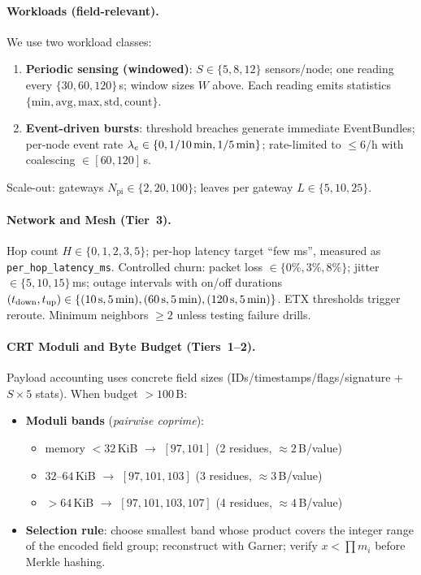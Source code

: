 \documentclass[12pt,onecolumn]{IEEEtran} %
\begin{document}
\paragraph{Workloads (field-relevant).}
We use two workload classes:
\begin{enumerate}[leftmargin=*, itemsep=0.25em]
  \item \textbf{Periodic sensing (windowed)}: $S\in\{5,8,12\}$ sensors/node; one reading every $\{30,60,120\}$\,s; window sizes $W$ above. Each reading emits statistics $\{\text{min},\text{avg},\text{max},\text{std},\text{count}\}$.
  \item \textbf{Event-driven bursts}: threshold breaches generate immediate EventBundles; per-node event rate $\lambda_e\in\{0,1/10\text{\,min},1/5\text{\,min}\}$; rate-limited to $\leq6$/h with coalescing $\in[60,120]$\,s.
\end{enumerate}
Scale-out: gateways $N_{\text{pi}}\in\{2,20,100\}$; leaves per gateway $L\in\{5,10,25\}$.

\paragraph{Network and Mesh (Tier~3).}
Hop count $H\in\{0,1,2,3,5\}$; per-hop latency target ``few ms'', measured as \texttt{per\_hop\_latency\_ms}. Controlled churn: packet loss $\in\{0\%,3\%,8\%\}$; jitter $\in\{5,10,15\}$\,ms; outage intervals with on/off durations $(t_{\text{down}},t_{\text{up}})\in\{(10\text{\,s},5\text{\,min}),(60\text{\,s},5\text{\,min}),(120\text{\,s},5\text{\,min})\}$. ETX thresholds trigger reroute. Minimum neighbors $\geq 2$ unless testing failure drills.

\paragraph{CRT Moduli and Byte Budget (Tiers~1--2).}
Payload accounting uses concrete field sizes (IDs/timestamps/flags/signature + $S\times5$ stats). When budget $>100$\,B:
\begin{itemize}[leftmargin=*, itemsep=0.1em]
  \item \textbf{Moduli bands} (\emph{pairwise coprime}): 
    \begin{itemize}[leftmargin=1.25em]
      \item memory $<32$\,KiB $\rightarrow$ $[97,101]$ (2 residues, $\approx 2$\,B/value)
      \item $32$--$64$\,KiB $\rightarrow$ $[97,101,103]$ (3 residues, $\approx 3$\,B/value)
      \item $>64$\,KiB $\rightarrow$ $[97,101,103,107]$ (4 residues, $\approx 4$\,B/value)
    \end{itemize}
  \item \textbf{Selection rule}: choose smallest band whose product covers the integer range of the encoded field group; reconstruct with Garner; verify $x<\prod m_i$ before Merkle hashing.
\end{itemize}
\end{document}
